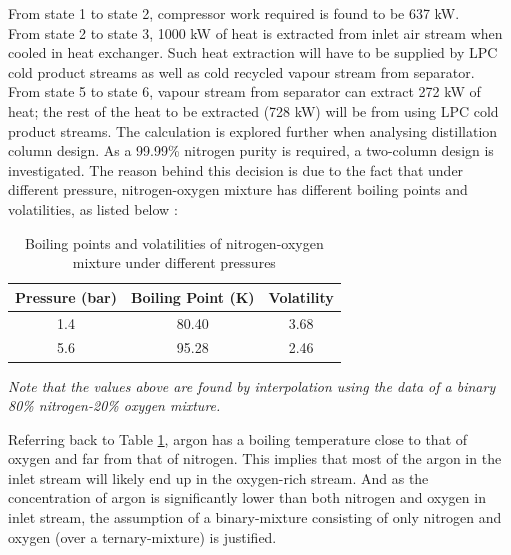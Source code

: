         From state 1 to state 2, compressor work required is found to be 637 kW. \\
        From state 2 to state 3, 1000 kW of heat is extracted from inlet air stream when cooled in heat exchanger. Such heat extraction will have to be supplied by LPC cold product streams as well as cold recycled vapour stream from separator. \\
        From state 5 to state 6, vapour stream from separator can extract 272 kW of heat; the rest of the heat to be extracted (728 kW) will be from using LPC cold product streams. The calculation is explored further when analysing distillation column design.
		 \label{sec:distillation_column}
        As a 99.99\% nitrogen purity is required, a two-column design is investigated. The reason behind this decision is due to the fact that under different pressure, nitrogen-oxygen mixture has different boiling points and volatilities, as listed below \citep{VLEdata}:
        \begin{table}[H]
            \singlespacing
            \centering
	        \caption{Boiling points and volatilities of nitrogen-oxygen mixture under different pressures}
	        \label{table:BP_volatilities_of_mixture}
	
	        \begin{tabular}{|c|c|c|}
	        \hline
	        Pressure (bar)	& Boiling Point (K)	& Volatility \textalpha \\  \hline
	        1.4				& 80.40				& 3.68 \\   \hline
	        5.6				& 95.28				& 2.46 \\   \hline
	        \end{tabular}
	        \vspace{1ex}
	        
	        \raggedright \emph{Note that the values above are found by interpolation using the data of a binary 80\% nitrogen-20\% oxygen mixture.}
        \end{table}
        \noindent Referring back to Table \ref{table:BP_volatilities_of_mixture}, argon has a boiling temperature close to that of oxygen and far from that of nitrogen. This implies that most of the argon in the inlet stream will likely end up in the oxygen-rich stream. And as the concentration of argon is significantly lower than both nitrogen and oxygen in inlet stream, the assumption of a binary-mixture consisting of only nitrogen and oxygen (over a ternary-mixture) is justified. \\
